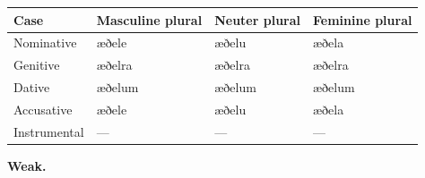\par\begingroup
\fontsize{10.5}{13.2}\selectfont
\par\begin{minipage}{\linewidth}\raggedright
\setlength{\LTleft}{0pt}\setlength{\LTright}{\fill}
\noindent
\begin{tabular}{@{}>{\raggedright\arraybackslash}p{22mm}>{\raggedright\arraybackslash}p{31.18mm}>{\raggedright\arraybackslash}p{31.18mm}>{\raggedright\arraybackslash}p{31.18mm}@{}}
\toprule
\textbf{Case} & \textbf{Masculine plural} & \textbf{Neuter plural} & \textbf{Feminine plural} \\
\midrule
Nominative & æðele & æðelu & æðela \\
Genitive & æðelra & æðelra & æðelra \\
Dative & æðelum & æðelum & æðelum \\
Accusative & æðele & æðelu & æðela \\
Instrumental & — & — & — \\
\bottomrule
\end{tabular}
\end{minipage}\par
\par\endgroup
\par\addvspace{5pt}

\textbf{Weak.}

